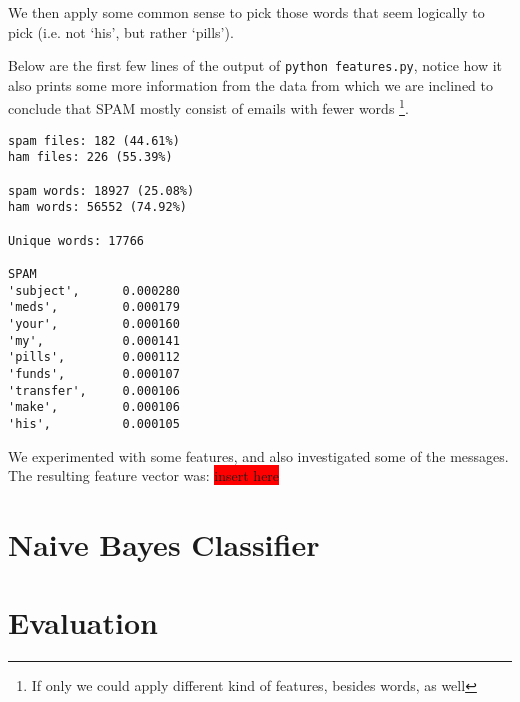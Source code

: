 \documentclass[a4paper,11pt]{article}
\newcommand{\todo}[1]{\colorbox{red}{\color{white}#1}}
\begin{document}
We then apply some common sense to pick those words that seem logically to 
pick (i.e. not `his', but rather `pills').  

Below are the first few lines of the output of \texttt{python features.py}, 
notice how it also prints some more information from the data from which we 
are inclined to conclude that SPAM mostly consist of emails with fewer words \footnote{If only we could apply different kind of features, besides words, as well}. 
\begin{center}
\begin{verbatim}
spam files: 182 (44.61%)
ham files: 226 (55.39%)

spam words: 18927 (25.08%)
ham words: 56552 (74.92%)

Unique words: 17766

SPAM
'subject',      0.000280
'meds',         0.000179
'your',         0.000160
'my',           0.000141
'pills',        0.000112
'funds',        0.000107
'transfer',     0.000106
'make',         0.000106
'his',          0.000105
\end{verbatim}
\end{center}

We experimented with some features, and also investigated some of the 
messages. The resulting feature vector was: \todo{insert here}



\section{Naive Bayes Classifier}


\section{Evaluation}
\end{document}
